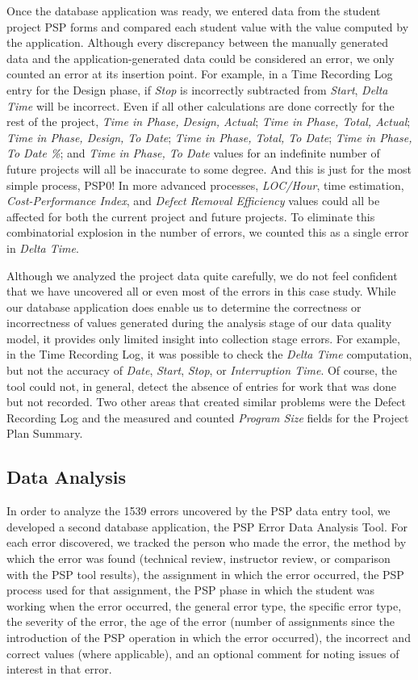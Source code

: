   Once the database application was ready, we entered data from the student
  project PSP forms and compared each student value with the
  value computed by the application.  Although every discrepancy
  between the manually generated data and the application-generated data
  could be considered an error, we only counted an error at its insertion
  point.  For example, in a Time Recording Log entry for the Design phase,
  if {\it Stop} is incorrectly subtracted from {\it Start}, {\it Delta
    Time} will be incorrect.  Even if all other calculations are done
  correctly for the rest of the project, {\it Time in Phase, Design,
    Actual}; {\it Time in Phase, Total, Actual}; {\it Time in Phase,
    Design, To Date}; {\it Time in Phase, Total, To Date}; {\it Time in
    Phase, To Date \%}; and {\it Time in Phase, To Date} values for an
  indefinite number of future projects will all be inaccurate to some
  degree.  And this is just for the most simple process, PSP0!  In more
  advanced processes, {\it LOC/Hour}, time estimation, {\it Cost-Performance
    Index}, and {\it Defect Removal Efficiency} values could all be
  affected for both the current project and future projects.  To eliminate
  this combinatorial explosion in the number of errors, we counted this as a
  single error in {\it Delta Time}. 
  
  Although we analyzed the project data quite carefully, we do not feel
  confident that we have uncovered all or even most of the errors in this
  case study.  While our database application does enable us to determine
  the correctness or incorrectness of values generated during the analysis
  stage of our data quality model, it provides only limited insight into
  collection stage errors.  For example, in the Time Recording Log, it was
  possible to check the {\it Delta Time} computation, but not the accuracy
  of {\it Date}, {\it Start}, {\it Stop}, or {\it Interruption Time}.  Of
  course, the tool could not, in general, detect the absence of entries for
  work that was done but not recorded.  Two other areas that created
  similar problems were the Defect Recording Log and the measured and
  counted {\it Program Size} fields for the Project Plan Summary.

\subsection{Data Analysis}
  
  In order to analyze the 1539 errors uncovered by the PSP data entry tool,
  we developed a second database application, the PSP Error Data Analysis
  Tool.  For each error discovered, we tracked the person who made the
  error, the method by which the error was found (technical review,
  instructor review, or comparison with the PSP tool results), the
  assignment in which the error occurred, the PSP process used for that
  assignment, the PSP phase in which the student was working when the error
  occurred, the general error type, the specific error type, the severity
  of the error, the age of the error (number of assignments since the
  introduction of the PSP operation in which the error occurred), the
  incorrect and correct values (where applicable), and an optional comment
  for noting issues of interest in that error.

